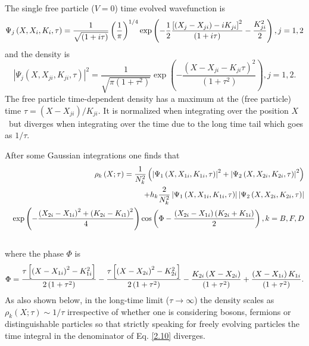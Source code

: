\documentclass[preprint,aps]{revtex4}
\begin{document}
The single free particle ($V=0$) time evolved wavefunction is
\begin{equation}
\Psi _{j}\left( X,X_{i},K_{i},\tau \right) =\frac{1}{\sqrt{\left( 1+i\tau
\right) }}\left( \frac{1}{\pi }\right) ^{1/4}\exp \left( -\frac{1}{2}\frac{%
\left[ \left( X_{j}-X_{ji}\right) -iK_{ji}\right] ^{2}}{\left( 1+i\tau
\right) }-\frac{K_{ji}^{2}}{2}\right) ,j=1,2  \label{2.13}
\end{equation}%
and the density is
\begin{equation}
\left\vert \Psi _{j}\left( X,X_{ji},K_{ji},\tau \right) \right\vert ^{2}=%
\frac{1}{\sqrt{\pi \left( 1+\tau ^{2}\right) }}\exp \left( -\frac{\left(
X-X_{ji}-K_{ji}\tau \right) ^{2}}{\left( 1+\tau ^{2}\right) }\right) ,j=1,2.
\label{2.14}
\end{equation}%
The free particle time-dependent density has a maximum at the (free particle) time $\tau
=\left( X-X_{ji}\right) /K_{ji}$. It is normalized when integrating over the
position $X$ \ but diverges when integrating over the time due to the long
time tail which goes as $1/\tau $.

After some Gaussian integrations one finds that
\begin{eqnarray}
&&\rho _{k}\left( X;\tau \right) =\frac{1}{N_{k}^{2}}\left( \left\vert \Psi
_{1}\left( X,X_{1i},K_{1i},\tau \right) \right\vert ^{2}+\left\vert \Psi
_{2}\left( X,X_{2i},K_{2i},\tau \right) \right\vert ^{2}\right)  \notag \\
&&+h_{k}\frac{2}{N_{k}^{2}}\left\vert \Psi _{1}\left( X,X_{1i},K_{1i},\tau
\right) \right\vert \left\vert \Psi _{2}\left( X,X_{2i},K_{2i},\tau \right)
\right\vert  \notag \\
&&\exp \left( -\frac{\left( X_{2i}-X_{1i}\right) ^{2}+\left(
K_{2i}-K_{i1}\right) ^{2}}{4}\right) \cos \left( \Phi -\frac{\left(
X_{2i}-X_{1i}\right) \left( K_{2i}+K_{1i}\right) }{2}\right) ,k=B,F,D  \notag
\\
&&  \label{2.15}
\end{eqnarray}%
where the phase $\Phi $ is%
\begin{equation}
\Phi =\frac{\tau \left[ \left( X-X_{1i}\right) ^{2}-K_{1i}^{2}\right] }{%
2\left( 1+\tau ^{2}\right) }-\frac{\tau \left[ \left( X-X_{2i}\right)
^{2}-K_{2i}^{2}\right] }{2\left( 1+\tau ^{2}\right) }-\frac{K_{2i}\left(
X-X_{2i}\right) }{\left( 1+\tau ^{2}\right) }+\frac{\left( X-X_{1i}\right)
K_{1i}}{\left( 1+\tau ^{2}\right) }.  \label{2.16}
\end{equation}%
As also shown below, in the long-time limit ($\tau \rightarrow \infty $) the
density scales as $\rho _{k}\left( X;\tau \right) \sim 1/\tau $ irrespective of
whether one is considering bosons, fermions or distinguishable particles so
that strictly speaking for freely evolving particles the time integral in the denominator of Eq. \ref{2.10}
diverges.
\end{document}
